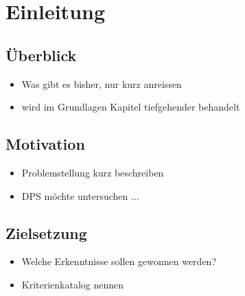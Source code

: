 \chapter{Einleitung}

\section{\"Uberblick}
\begin{itemize}
  \item Was gibt es bisher, nur kurz anreissen
  \item wird im Grundlagen Kapitel tiefgehender behandelt
\end{itemize}

\section{Motivation}
\begin{itemize}
  \item Problemstellung kurz beschreiben
  \item DPS m\"ochte untersuchen ...
\end{itemize}

\section{Zielsetzung}
\begin{itemize}
  \item Welche Erkenntnisse sollen gewonnen werden?
  \item Kriterienkatalog nennen
\end{itemize}
